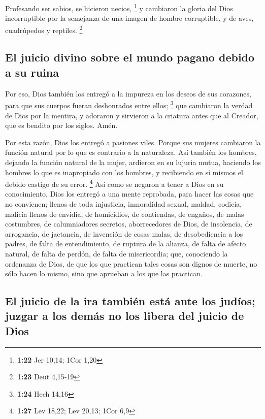  Profesando ser sabios, se hicieron necios, \footnote{\textbf{1:22}
  Jer 10,14; 1Cor 1,20}  y cambiaron la gloria del Dios
incorruptible por la semejanza de una imagen de hombre corruptible, y de
aves, cuadrúpedos y reptiles. \footnote{\textbf{1:23} Deut 4,15-19}

\hypertarget{el-juicio-divino-sobre-el-mundo-pagano-debido-a-su-ruina}{%
\subsection{El juicio divino sobre el mundo pagano debido a su
ruina}\label{el-juicio-divino-sobre-el-mundo-pagano-debido-a-su-ruina}}

 Por eso, Dios también los entregó a la impureza en los
deseos de sus corazones, para que sus cuerpos fueran deshonrados entre
ellos; \footnote{\textbf{1:24} Hech 14,16}  que cambiaron
la verdad de Dios por la mentira, y adoraron y sirvieron a la criatura
antes que al Creador, que es bendito por los siglos. Amén.

 Por esta razón, Dios los entregó a pasiones viles.
Porque sus mujeres cambiaron la función natural por lo que es contrario
a la naturaleza.  Así también los hombres, dejando la
función natural de la mujer, ardieron en su lujuria mutua, haciendo los
hombres lo que es inapropiado con los hombres, y recibiendo en sí mismos
el debido castigo de su error. \footnote{\textbf{1:27} Lev 18,22; Lev
  20,13; 1Cor 6,9}  Así como se negaron a tener a Dios en
su conocimiento, Dios los entregó a una mente reprobada, para hacer las
cosas que no convienen;  llenos de toda injusticia,
inmoralidad sexual, maldad, codicia, malicia llenos de envidia, de
homicidios, de contiendas, de engaños, de malas costumbres, de
calumniadores secretos,  aborrecedores de Dios, de
insolencia, de arrogancia, de jactancia, de invención de cosas malas, de
desobediencia a los padres,  de falta de entendimiento,
de ruptura de la alianza, de falta de afecto natural, de falta de
perdón, de falta de misericordia;  que, conociendo la
ordenanza de Dios, de que los que practican tales cosas son dignos de
muerte, no sólo hacen lo mismo, sino que aprueban a los que las
practican.

\hypertarget{el-juicio-de-la-ira-tambiuxe9n-estuxe1-ante-los-juduxedos-juzgar-a-los-demuxe1s-no-los-libera-del-juicio-de-dios}{%
\subsection{El juicio de la ira también está ante los judíos; juzgar a
los demás no los libera del juicio de
Dios}\label{el-juicio-de-la-ira-tambiuxe9n-estuxe1-ante-los-juduxedos-juzgar-a-los-demuxe1s-no-los-libera-del-juicio-de-dios}}

